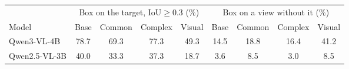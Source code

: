 \begin{tabular*}{\linewidth}{@{\extracolsep{\fill}}lcccccccc@{}}
\toprule
& \multicolumn{4}{c}{Box on the target, IoU${\ge}0.3$ (\%)} & \multicolumn{4}{c}{Box on a view without it (\%)}\\
\cmidrule(lr){2-5}\cmidrule(l){6-9}
Model & Base & Common & Complex & Visual & Base & Common & Complex & Visual\\
\midrule
Qwen3-VL-4B & 78.7 & 69.3 & 77.3 & 49.3 & 14.5 & 18.8 & 16.4 & 41.2\\
Qwen2.5-VL-3B & 40.0 & 33.3 & 37.3 & 18.7 & 3.6 & 8.5 & 3.0 & 8.5\\
\bottomrule
\end{tabular*}
